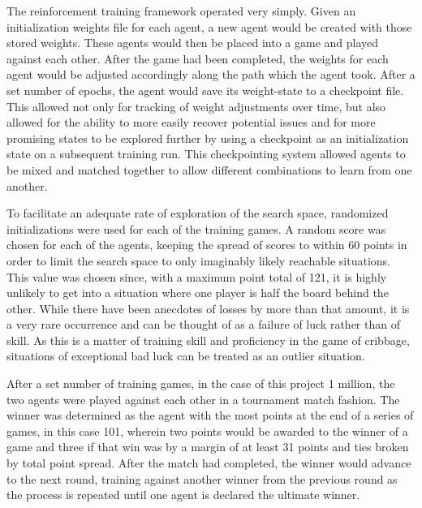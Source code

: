 
The reinforcement training framework operated very simply.
%
Given an initialization weights file for each agent, a new agent would be
created with those stored weights.
%
These agents would then be placed into a game and played against each other.
%
After the game had been completed, the weights for each agent would be adjusted
accordingly along the path which the agent took.
%
After a set number of epochs, the agent would save its weight-state to a
checkpoint file.
%
This allowed not only for tracking of weight adjustments over time, but also
allowed for the ability to more easily recover potential issues and for more
promising states to be explored further by using a checkpoint as an
initialization state on a subsequent training run.
%
This checkpointing system allowed agents to be mixed and matched together to
allow different combinations to learn from one another.

%
To facilitate an adequate rate of exploration of the search space,
randomized initializations were used for each of the training games.
%
A random score was chosen for each of the agents,
keeping the spread of scores to within 60 points
in order to limit the search space to only imaginably likely reachable
situations.
%
This value was chosen since,
with a maximum point total of 121,
it is highly unlikely to get into a situation where one player is half the board
behind the other.
%
While there have been anecdotes of losses by more than that amount,
it is a very rare occurrence and can be thought of as a failure of luck
rather than of skill.
%
As this is a matter of training skill and proficiency in the game of cribbage,
situations of exceptional bad luck can be treated as an outlier situation.

After a set number of training games,
in the case of this project 1 million,
the two agents were played against each other in a tournament match fashion.
%
The winner was determined as the agent with the most points at the end
of a series of games, %
in this case 101, %
wherein two points would be awarded to the winner of a game and three if that
win was by a margin of at least 31 points
and ties broken by total point spread.
%
After the match had completed,
the winner would advance to the next round,
training against another winner from the previous round as the process is
repeated until one agent is declared the ultimate winner.

